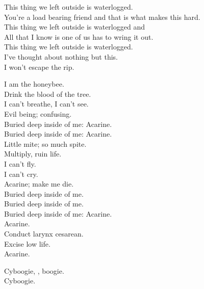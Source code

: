 This thing we left outside is waterlogged. \\
You're a load bearing friend and that is what makes this hard. \\
This thing we left outside is waterlogged and \\
All that I know is one of us has to wring it out. \\
This thing we left outside is waterlogged. \\
I've thought about nothing but this. \\
I won't escape the rip. \\




I am the honeybee. \\
Drink the blood of the tree. \\
I can't breathe, I can't see. \\
Evil being; confusing. \\

Buried deep inside of me: Acarine. \\
Buried deep inside of me: Acarine. \\

Little mite; so much spite. \\
Multiply, ruin life. \\
I can't fly. \\
I can't cry. \\
Acarine; make me die. \\

Buried deep inside of me. \\
Buried deep inside of me. \\
Buried deep inside of me: Acarine. \\

Acarine. \\
Conduct larynx cesarean. \\
Excise low life. \\
Acarine. \\




Cyboogie, , boogie. \\
Cyboogie. \\

